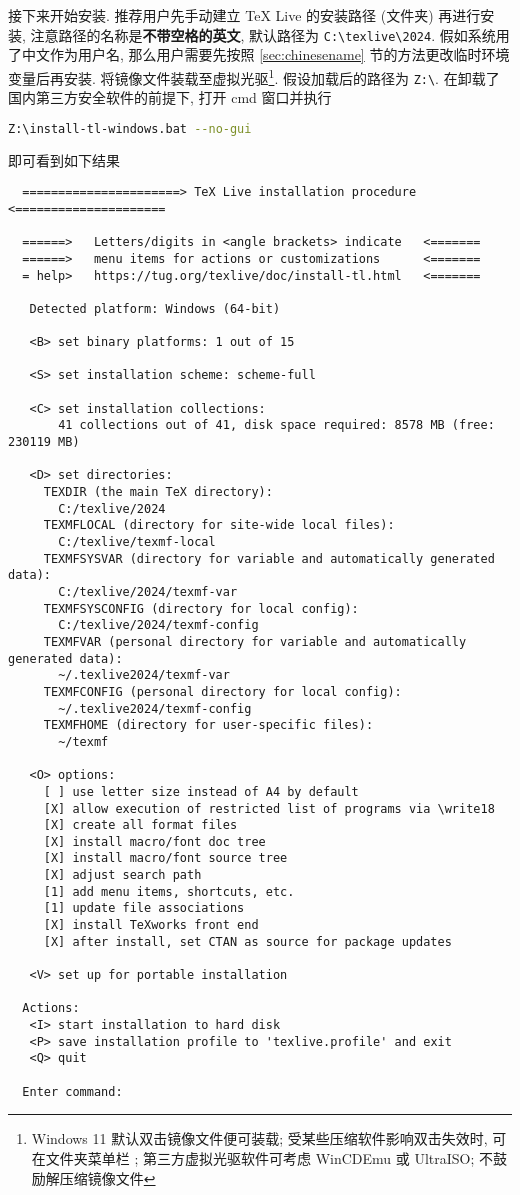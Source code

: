 接下来开始安装.
推荐用户先手动建立 \TeX{} Live 的安装路径 (文件夹) 再进行安装,
注意路径的名称是\textbf{不带空格的英文},
默认路径为 \texttt{C:\textbackslash texlive\textbackslash 2024}.
假如系统用了中文作为用户名,
那么用户需要先按照 \ref{sec:chinesename} 节的方法更改临时环境变量后再安装.
将镜像文件装载至虚拟光驱\footnote{Windows 11 默认双击镜像文件便可装载;
受某些压缩软件影响双击失效时,
可在文件夹菜单栏
;
第三方虚拟光驱软件可考虑 WinCDEmu 或 UltraISO;
不鼓励解压缩镜像文件}. 
假设加载后的路径为 \texttt{Z:\textbackslash}.
在卸载了国内第三方安全软件的前提下,
打开 \textsf{cmd} 窗口并执行
\begin{lstlisting}[language = bash]
  Z:\install-tl-windows.bat --no-gui
\end{lstlisting}
即可看到如下结果
\begin{lstlisting}
  ======================> TeX Live installation procedure <=====================

  ======>   Letters/digits in <angle brackets> indicate   <=======
  ======>   menu items for actions or customizations      <=======
  = help>   https://tug.org/texlive/doc/install-tl.html   <=======

   Detected platform: Windows (64-bit)

   <B> set binary platforms: 1 out of 15

   <S> set installation scheme: scheme-full

   <C> set installation collections:
       41 collections out of 41, disk space required: 8578 MB (free: 230119 MB)

   <D> set directories:
     TEXDIR (the main TeX directory):
       C:/texlive/2024
     TEXMFLOCAL (directory for site-wide local files):
       C:/texlive/texmf-local
     TEXMFSYSVAR (directory for variable and automatically generated data):
       C:/texlive/2024/texmf-var
     TEXMFSYSCONFIG (directory for local config):
       C:/texlive/2024/texmf-config
     TEXMFVAR (personal directory for variable and automatically generated data):
       ~/.texlive2024/texmf-var
     TEXMFCONFIG (personal directory for local config):
       ~/.texlive2024/texmf-config
     TEXMFHOME (directory for user-specific files):
       ~/texmf

   <O> options:
     [ ] use letter size instead of A4 by default
     [X] allow execution of restricted list of programs via \write18
     [X] create all format files
     [X] install macro/font doc tree
     [X] install macro/font source tree
     [X] adjust search path
     [1] add menu items, shortcuts, etc.
     [1] update file associations
     [X] install TeXworks front end
     [X] after install, set CTAN as source for package updates

   <V> set up for portable installation

  Actions:
   <I> start installation to hard disk
   <P> save installation profile to 'texlive.profile' and exit
   <Q> quit

  Enter command:
\end{lstlisting}
